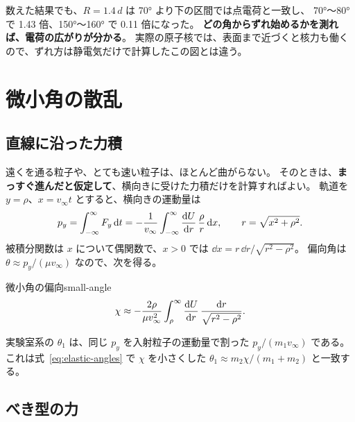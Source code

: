 
数えた結果でも、$R=1.4\,d$ は \ang{70} より下の区間では点電荷と一致し、
\ang{70}〜\ang{80} で 1.43 倍、\ang{150}〜\ang{160} で 0.11 倍になった。
\textbf{どの角からずれ始めるかを測れば、電荷の広がりが分かる}。
実際の原子核では、表面まで近づくと核力も働くので、ずれ方は静電気だけで計算したこの図とは違う。

\section{微小角の散乱}\label{sec:coll-small}

\subsection{直線に沿った力積}

遠くを通る粒子や、とても速い粒子は、ほとんど曲がらない。
そのときは、\textbf{まっすぐ進んだと仮定して}、横向きに受けた力積だけを計算すればよい。
軌道を $y=\rho$、$x=v_\infty t$ とすると、横向きの運動量は
\begin{equation}
  p_y=\int_{-\infty}^{\infty}F_y\,\mathrm{d} t
  =-\frac{1}{v_\infty}\int_{-\infty}^{\infty}\frac{\mathrm{d} U}{\mathrm{d} r}\,\frac{\rho}{r}\,\mathrm{d} x,\qquad r=\sqrt{x^2+\rho^2}.
\end{equation}
被積分関数は $x$ について偶関数で、$x>0$ では $\dd x=r\,\dd r/\sqrt{r^2-\rho^2}$。
偏向角は $\theta\approx p_y/(\mu v_\infty)$ なので、次を得る。

\begin{result}{微小角の偏向}{small-angle}
\begin{equation}
  \chi\approx-\frac{2\rho}{\mu v_\infty^2}\int_\rho^\infty\frac{\mathrm{d} U}{\mathrm{d} r}\,\frac{\mathrm{d} r}{\sqrt{r^2-\rho^2}} .
  \label{eq:small-angle}
\end{equation}
\end{result}

実験室系の $\theta_1$ は、同じ $p_y$ を入射粒子の運動量で割った $p_y/(m_1v_\infty)$ である。
これは式~\eqref{eq:elastic-angles} で $\chi$ を小さくした $\theta_1\approx m_2\chi/(m_1+m_2)$ と一致する。

\subsection{べき型の力}

